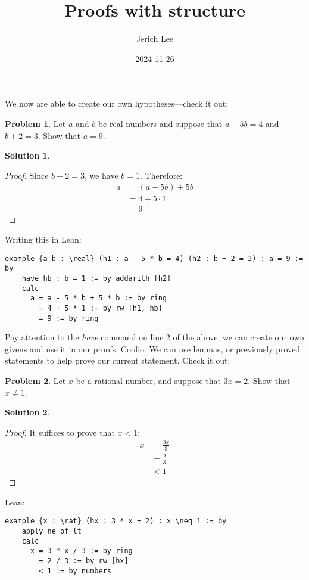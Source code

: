 \documentclass[12pt]{article}
\title{Proofs with structure}
\author{Jerich Lee}
\date{2024-11-26}
\theoremstyle{definition} %
\newtheorem{solution}{Solution}
\newtheorem{problem}{Problem}
\theoremstyle{plain} %
\begin{document}
\maketitle
We now are able to create our own hypotheses—check it out:
\begin{problem}
    Let $a$ and $b$ be real numbers and suppose that $a-5b=4$ and $b+2=3$. Show that $a=9$.  
\end{problem}
\begin{solution}
    \begin{proof} Since $b+2=3$, we have $b=1$. Therefore:
        \begin{align}
           a&=(a-5b)+5b \\[10pt] 
            &=4+5 \cdot1 \\[10pt] 
            &=9
        \end{align}
    \end{proof}
\end{solution}
Writing this in Lean:
\begin{lstlisting}
example {a b : \real} (h1 : a - 5 * b = 4) (h2 : b + 2 = 3) : a = 9 := by
    have hb : b = 1 := by addarith [h2]
    calc
      a = a - 5 * b + 5 * b := by ring
      _ = 4 + 5 * 1 := by rw [h1, hb]
      _ = 9 := by ring
\end{lstlisting}
Pay attention to the \emph{have} command on line 2 of the above; we can create our own givens and use it in our proofs. Coolio.
\vspace{.5cm} 
We can use lemmas, or previously proved statements to help prove our current statement. Check it out:
\begin{problem}
    Let $x$ be a rational number, and suppose that $3x=2$. Show that $x\neq 1$.  
\end{problem}
\begin{solution}
    \begin{proof} It suffices to prove that $x<1$: 
        \begin{align}
           x&=\frac{3x}{3} \\[10pt] 
           &= \frac{2}{3}\\[10pt] 
            &<1
        \end{align}
    \end{proof}
\end{solution}
Lean:
\begin{lstlisting}
example {x : \rat} (hx : 3 * x = 2) : x \neq 1 := by
    apply ne_of_lt
    calc
      x = 3 * x / 3 := by ring
      _ = 2 / 3 := by rw [hx]
      _ < 1 := by numbers
\end{lstlisting} 
\end{document}

